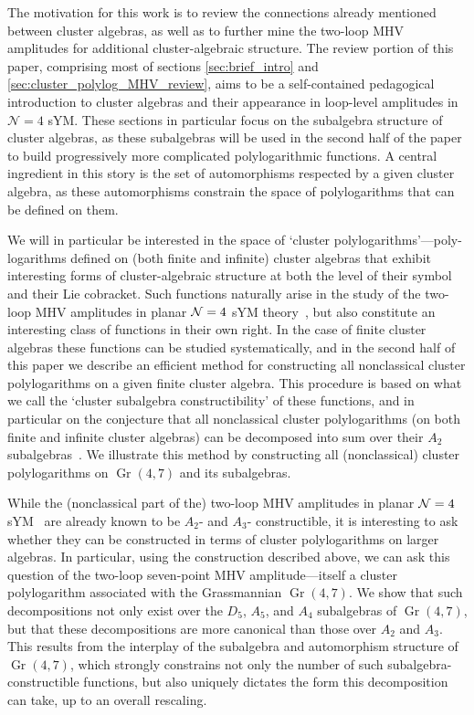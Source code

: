 \documentclass[12pt]{article}
\DeclareMathOperator{\Gr}{Gr}
\begin{document}
The motivation for this work is to review the connections already mentioned between cluster algebras, as well as to further mine the two-loop MHV amplitudes for additional cluster-algebraic structure. The review portion of this paper, comprising most of sections \ref{sec:brief_intro} and \ref{sec:cluster_polylog_MHV_review}, aims to be a self-contained pedagogical introduction to cluster algebras and their appearance in loop-level amplitudes in $\mathcal{N}=4$ sYM. These sections in particular focus on the subalgebra structure of cluster algebras, as these subalgebras will be used in the second half of the paper to build progressively more complicated polylogarithmic functions. A central ingredient in this story is the set of automorphisms respected by a given cluster algebra, as these automorphisms constrain the space of polylogarithms that can be defined on them.

We will in particular be interested in the space of `cluster polylogarithms'---poly- logarithms defined on (both finite and infinite) cluster algebras that exhibit interesting forms of cluster-algebraic structure at both the level of their symbol and their Lie cobracket. Such functions naturally arise in the study of the two-loop MHV amplitudes in planar ${\cal N} =4$ sYM theory~\cite{Golden:2014xqa}, but also constitute an interesting class of functions in their own right. In the case of finite cluster algebras these functions can be studied systematically, and in the second half of this paper we describe an efficient method for constructing all nonclassical cluster polylogarithms on a given finite cluster algebra. This procedure is based on what we call the `cluster subalgebra constructibility' of these functions, and in particular on the conjecture that all nonclassical cluster polylogarithms (on both finite and infinite cluster algebras) can be decomposed into sum over their $A_2$ subalgebras~\cite{Golden:2014xqa}. We illustrate this method by constructing all (nonclassical) cluster polylogarithms on $\Gr(4,7)$ and its subalgebras.

While the (nonclassical part of the) two-loop MHV amplitudes in planar ${\cal N} =4$ sYM~\cite{Golden:2014xqa} are already known to be $A_2$- and $A_3$- constructible, it is interesting to ask whether they can be constructed in terms of cluster polylogarithms on larger algebras. In particular, using the construction described above, we can ask this question of the two-loop seven-point MHV amplitude---itself a cluster polylogarithm associated with the Grassmannian $\Gr(4,7)$. We show that such decompositions not only exist over the $D_5$, $A_5$, and $A_4$ subalgebras of $\Gr(4,7)$, but that these decompositions are more canonical than those over $A_2$ and $A_3$. This results from the interplay of the subalgebra and automorphism structure of $\Gr(4,7)$, which strongly constrains not only the number of such subalgebra-constructible functions, but also uniquely dictates the form this decomposition can take, up to an overall rescaling.
\end{document}
